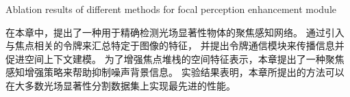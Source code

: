 %
%
\begin{table}[!ht]
	{Ablation results of different methods for focal perception enhancement module}
	
	\centering
	\label{table:abl_methods}
\end{table}
%
%
%
%
在本章中，提出了一种用于精确检测光场显著性物体的聚焦感知网络。 
通过引入与焦点相关的令牌来汇总特定于图像的特征，
并提出令牌通信模块来传播信息并促进空间上下文建模。 
为了增强焦点堆栈的空间特征表示，本章提出了一种聚焦感知增强策略来帮助抑制噪声背景信息。 
实验结果表明，本章所提出的方法可以在大多数光场显著性分割数据集上实现最先进的性能。






























